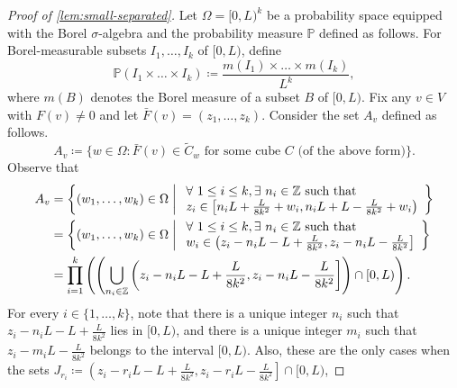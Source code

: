 \documentclass[12pt,a4paper,bold]{thesis}
\theoremstyle{definition}
\begin{document}
\begin{proof}[Proof of \cref{lem:small-separated}]
    Let $\Omega = [0,L)^k$ be a probability space equipped with the Borel $\sigma$-algebra
    and the probability measure $\mathbb{P}$ defined as follows. For Borel-measurable 
    subsets $I_1, \dots, I_k$ of $[0,L)$, define 
    \begin{equation*}
        \mathbb{P}(I_1 \times \dots \times I_k) \coloneq 
        \frac{m(I_1) \times \dots \times m(I_k)}{L^k},
    \end{equation*}
    where $m(B)$ denotes the Borel measure of a subset $B$ of $[0,L)$.
    Fix any $v \in V$ with $F(v) \neq 0$ and let $\bar{F}(v) = (z_1, \dots, z_k)$. 
    Consider the set $A_v$ defined as follows.
    \begin{equation*}
        A_v \coloneq \{w \in \Omega : \bar{F}(v) \in \tilde C_w \text{ for some cube } 
        C \text{ (of the above form)}\}.
    \end{equation*}
    Observe that 
    \begin{align*}
        A_v 
        & = 
        \left\{(w_1, \dots, w_k) \in \Omega \biggm| 
        \begin{array}{l} 
            \forall\ 1 \leq i \leq k, \exists\ n_i \in \mathbb{Z} \text{ such that} 
			\\
            z_i \in \left[n_iL + \frac{L}{8k^2} + w_i, n_iL + L - \frac{L}{8k^2} + w_i\right)
        \end{array}
        \right\} 
        \\
        & = 
        \left\{(w_1, \dots, w_k) \in \Omega \biggm| 
        \begin{array}{l} 
            \forall\ 1 \leq i \leq k, \exists\ n_i \in \mathbb{Z} \text{ such that} 
			\\
            w_i \in \left(z_i - n_iL - L + \frac{L}{8k^2}, z_i - n_iL - \frac{L}{8k^2}\right]
        \end{array}
        \right\}
        \\
        & =
        \prod_{i=1}^{k} \left(\left(\bigcup_{n_i \in \mathbb{Z}} 
        \left(z_i - n_iL - L + \frac{L}{8k^2}, z_i - n_iL - \frac{L}{8k^2}\right]\right) 
        \cap [0,L)\right).
    \end{align*}
    For every $i \in \{1, \dots, k\}$, note that there is a unique integer $n_i$ such that 
    $z_i - n_iL - L + \frac{L}{8k^2}$ lies in $[0,L)$, and there is a unique integer $m_i$
    such that $z_i - m_iL - \frac{L}{8k^2}$ belongs to the interval $[0,L)$. 
    Also, these are the only cases when the sets $J_{r_i} \coloneq 
    \left(z_i - r_iL - L + \frac{L}{8k^2}, z_i - r_iL - \frac{L}{8k^2}\right] \cap [0,L)$, 

\end{proof}
\end{document}
